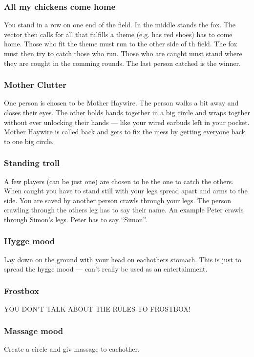 \documentclass[../../../main.tex]{subfiles}
\begin{document}
\begin{multicols}{2}
\subsubsection*{All my chickens come home}
You stand in a row on one end of the field. In the middle stands the fox. The vector then calls for all that fulfills a theme (e.g. has red shoes) has to come home. Those who fit the theme must run to the other side of th field. The fox must then try to catch those who run. Those who are caught must stand where they are cought in the comming rounds. The last person catched is the winner.

\subsubsection*{Mother Clutter}
One person is chosen to be Mother Haywire. The person walks a bit away and closes their eyes. The other holds hands together in a big circle and wraps togther without ever unlocking their hands --- like your wired earbuds left in your pocket. Mother Haywire is called back and gets to fix the mess by getting everyone back to one big circle.

\subsubsection*{Standing troll}
A few players (can be just one) are chosen to be the one to catch the others. When caught you have to stand still with your legs spread apart and arms to the side. You are saved by another person crawls through your legs. The person crawling through the others leg has to say their name. An example Peter crawls through Simon's legs. Peter has to say ``Simon''.

\subsubsection*{Hygge mood}
Lay down on the ground with your head on eachothers stomach. This is just to spread the hygge mood --- can't really be used as an entertainment.

\subsubsection*{Frostbox}
YOU DON'T TALK ABOUT THE RULES TO FROSTBOX!


\subsubsection*{Massage mood}
Create a circle and giv massage to eachother.



\end{multicols}
\end{document}
